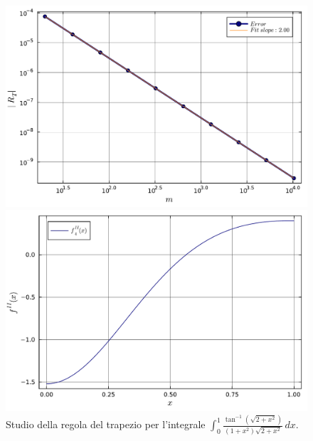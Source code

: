 \documentclass[letterpaper, 12pt]{article}
\begin{document}
\begin{figure}[!ht]
    \centering
    \begin{minipage}[b]{0.47\textwidth}
        \includegraphics[width=\textwidth]{5124.pdf}
    \end{minipage}
    \hspace{0.5cm}
    \begin{minipage}[b]{0.47\textwidth}
        \includegraphics[width=\textwidth]{5124_2.pdf}
    \end{minipage}
    \caption{Studio della regola del trapezio per l'integrale $\int_0^1 \frac{\tan^{-1}(\sqrt{2+x^2})}{(1+x^2)\sqrt{2+x^2}}\,dx$.}
    \label{fig:es5_1_2_4}
\end{figure}
\end{document}
